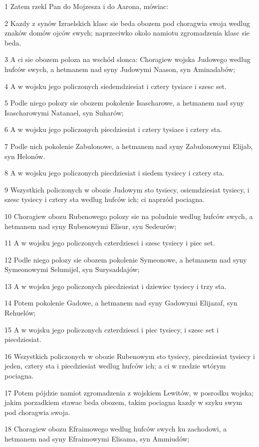 \par 1 Zatem rzekl Pan do Mojzesza i do Aarona, mówiac:
\par 2 Kazdy z synów Izraelskich klasc sie beda obozem pod choragwia swoja wedlug znaków domów ojców swych; naprzeciwko okolo namiotu zgromadzenia klasc sie beda.
\par 3 A ci sie obozem poloza na wschód slonca: Choragiew wojska Judowego wedlug hufców swych, a hetmanem nad syny Judowymi Naason, syn Aminadabów;
\par 4 A w wojsku jego policzonych siedemdziesiat i cztery tysiace i szesc set.
\par 5 Podle niego polozy sie obozem pokolenie Isascharowe, a hetmanem nad syny Isascharowymi Natanael, syn Suharów;
\par 6 A w wojsku jego policzonych piecdziesiat i cztery tysiace i cztery sta.
\par 7 Podle nich pokolenie Zabulonowe, a hetmanem nad syny Zabulonowymi Elijab, syn Helonów.
\par 8 A w wojsku jego policzonych piecdziesiat i siedem tysiecy i cztery sta.
\par 9 Wszystkich policzonych w obozie Judowym sto tysiecy, osiemdziesiat tysiecy, i szesc tysiecy i cztery sta wedlug hufców ich; ci naprzód pociagna.
\par 10 Choragiew obozu Rubenowego polozy sie na poludnie wedlug hufców swych, a hetmanem nad syny Rubenowymi Elisur, syn Sedeurów;
\par 11 A w wojsku jego policzonych czterdziesci i szesc tysiecy i piec set.
\par 12 Podle niego polozy sie obozem pokolenie Symeonowe, a hetmanem nad syny Symeonowymi Selumijel, syn Surysaddajów;
\par 13 A w wojsku jego policzonych piecdziesiat i dziewiec tysiecy i trzy sta.
\par 14 Potem pokolenie Gadowe, a hetmanem nad syny Gadowymi Elijazaf, syn Rehuelów;
\par 15 A w wojsku jego policzonych czterdziesci i piec tysiecy, i szesc set i piecdziesiat.
\par 16 Wszystkich policzonych w obozie Rubenowym sto tysiecy, piecdziesiat tysiecy i jeden, cztery sta i piecdziesiat wedlug hufców ich; a ci w rzedzie wtórym pociagna.
\par 17 Potem pójdzie namiot zgromadzenia z wojskiem Lewitów, w posrodku wojska; jakim porzadkiem stawac beda obozem, takim pociagna kazdy w szyku swym pod choragwia swoja.
\par 18 Choragiew obozu Efraimowego wedlug hufców swych ku zachodowi, a hetmanem nad syny Efraimowymi Elisama, syn Ammiudów;
